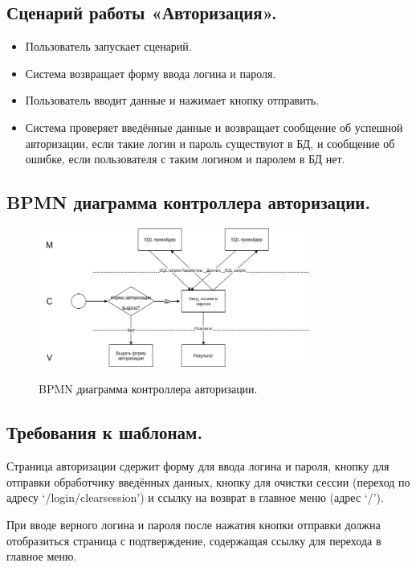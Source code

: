 \documentclass[12pt, a4paper]{article}
\begin{document}
	\subsection{Сценарий работы «Авторизация».}
	\begin{itemize}
		\item Пользователь запускает сценарий.
		\item Система возвращает форму ввода логина и пароля.
		\item Пользователь вводит данные и нажимает кнопку отправить.
		\item {Система проверяет введённые данные и возвращает сообщение об успешной
		       авторизации, если такие логин и пароль существуют в БД, и сообщение об ошибке,
	      	   если пользователя с таким логином и паролем в БД нет.}
	\end{itemize}

    \subsection{BPMN диаграмма контроллера авторизации.}
    \begin{figure}[h]
    	\centering    %
    	\includegraphics[width=0.8\textwidth]{pictures/BPMN_auth.png}
    	\label{fig:pic7} %
    	\caption{BPMN диаграмма контроллера авторизации.}
    \end{figure}

    \subsection{Требования к шаблонам.}
    Страница авторизации сдержит форму для ввода логина и пароля, кнопку для отправки
    обработчику введённых данных, кнопку для очистки сессии (переход по адресу ‘/login/clearsession’) и ссылку на возврат в главное меню (адрес ‘/’).
    
    При вводе верного логина и пароля после нажатия кнопки отправки должна отобразиться
    страница с подтверждение, содержащая ссылку для перехода в главное меню.
    
\end{document}
